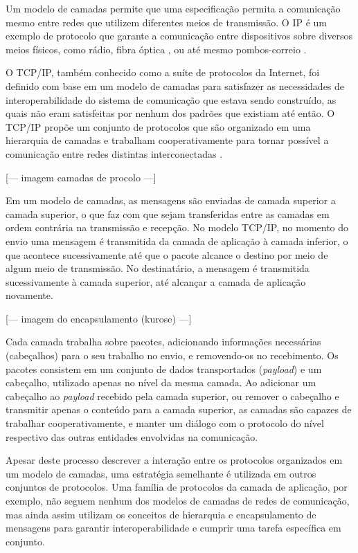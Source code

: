 Um modelo de camadas permite que uma especificação permita a comunicação mesmo entre
redes que utilizem diferentes meios de transmissão. O IP é um exemplo de protocolo
que garante a comunicação entre dispositivos sobre diversos meios físicos, como
rádio, fibra óptica \cite{tanenbaum2010}, ou até mesmo pombos-correio
\cite{rfc1149}.

O TCP/IP, também conhecido como a suíte de protocolos da Internet, foi definido com
base em um modelo de camadas para satisfazer as necessidades de interoperabilidade
do sistema de comunicação que estava sendo construído, as quais não eram satisfeitas
por nenhum dos padrões que existiam até então. O TCP/IP propõe um conjunto de
protocolos  que são organizado em uma hierarquia de camadas e trabalham
cooperativamente para tornar possível a comunicação entre redes distintas
interconectadas \cite{comer2000}.

[--- imagem camadas de procolo ---]

Em um modelo de camadas, as mensagens são enviadas de camada superior a camada
superior, o que faz com que sejam transferidas entre as camadas em ordem contrária
na transmissão e recepção. No modelo TCP/IP, no momento do envio uma mensagem é
transmitida da camada de aplicação à camada inferior, o que acontece sucessivamente
até que o pacote alcance o destino por meio de algum meio de transmissão. No
destinatário, a mensagem é transmitida sucessivamente à camada superior, até
alcançar a camada de aplicação novamente.

[--- imagem do encapsulamento (kurose) ---]

Cada camada trabalha sobre pacotes, adicionando informações necessárias (cabeçalhos)
para o seu trabalho no envio, e removendo-os no recebimento. Os pacotes consistem em
um conjunto de dados transportados (\textit{payload}) e um cabeçalho, utilizado
apenas no nível da mesma camada. Ao adicionar um cabeçalho ao \textit{payload}
recebido pela camada superior, ou remover o cabeçalho e transmitir apenas o conteúdo
para a camada superior, as camadas são capazes de trabalhar cooperativamente, e
manter um diálogo com o protocolo do nível respectivo das outras entidades
envolvidas na comunicação.

Apesar deste processo descrever a interação entre os protocolos organizados em um
modelo de camadas, uma estratégia semelhante é utilizada em outros conjuntos de
protocolos. Uma família de protocolos da camada de aplicação, por exemplo, não
seguem nenhum dos modelos de camadas de redes de comunicação, mas ainda assim
utilizam os conceitos de hierarquia e encapsulamento de mensagens para garantir
interoperabilidade e cumprir uma tarefa específica em conjunto.

